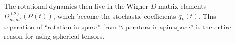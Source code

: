 \documentclass[notitlepage,11pt]{article}
\makeatletter
\newcommand{\hathat}[1]{%
\begingroup%
  \let\macc@kerna\z@%
  \let\macc@kernb\z@%
  \let\macc@nucleus\@empty%
  \hat{\mathchoice%
    {\raisebox{.35ex}{\vphantom{\ensuremath{\displaystyle #1}}}}%
    {\raisebox{.35ex}{\vphantom{\ensuremath{\textstyle #1}}}}%
    {\raisebox{.16ex}{\vphantom{\ensuremath{\scriptstyle #1}}}}%
    {\raisebox{.14ex}{\vphantom{\ensuremath{\scriptscriptstyle #1}}}}%
    \smash{\hat{#1}}}%
\endgroup%
}
\newcommand{\rmi}{\mathrm{i}}
\newcommand{\rme}{\mathrm{e}}
\makeatother
\begin{document}

The rotational dynamics then live in the Wigner $D$-matrix elements $D^{(2)}_{m,m'}(\Omega(t))$, which become the stochastic coefficients $q_k(t)$. This separation of ``rotation in space'' from ``operators in spin space'' is the entire reason for using spherical tensors.



\end{document}
